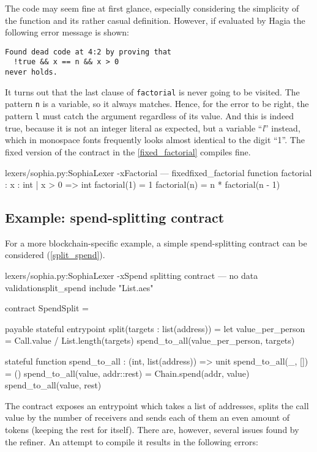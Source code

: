 The code may seem fine at first glance, especially considering the simplicity of
the function and its rather casual definition. However, if evaluated by Hagia
the following error message is shown:

\begin{Verbatim}[samepage=true]
Found dead code at 4:2 by proving that
  !true && x == n && x > 0
never holds.
\end{Verbatim}

It turns out that the last clause of \texttt{factorial} is never going to be
visited. The pattern \texttt{n} is a variable, so it always matches. Hence, for
the error to be right, the pattern \texttt{l} must catch the argument regardless
of its value. And this is indeed true, because it is not an integer literal as
expected, but a variable ``\textit{l}'' instead, which in monospace fonts
frequently looks almost identical to the digit ``1''. The fixed version of the
contract in the \autoref{fixed_factorial} compiles fine.

\begin{code}[H]{lexers/sophia.py:SophiaLexer -x}{Factorial --- fixed}{fixed_factorial}
function
  factorial : {x : int | x > 0} => int
  factorial(1) = 1
  factorial(n) = n * factorial(n - 1)
\end{code}

\subsection{Example: spend-splitting contract}

For a more blockchain-specific example, a simple spend-splitting contract can be
considered (\autoref{split_spend}).

\begin{code}[H]{lexers/sophia.py:SophiaLexer -x}{Spend splitting contract --- no data
    validation}{split_spend}
include "List.aes"

contract SpendSplit =

  payable stateful entrypoint split(targets : list(address)) =
    let value_per_person = Call.value / List.length(targets)
    spend_to_all(value_per_person, targets)

  stateful function
    spend_to_all : (int, list(address)) => unit
    spend_to_all(_, []) = ()
    spend_to_all(value, addr::rest) =
      Chain.spend(addr, value)
      spend_to_all(value, rest)
\end{code}

The contract exposes an entrypoint which takes a list of addresses, splits the
call value by the number of receivers and sends each of them an even amount of
tokens (keeping the rest for itself). There are, however, several issues found
by the refiner. An attempt to compile it results in the following
errors:

